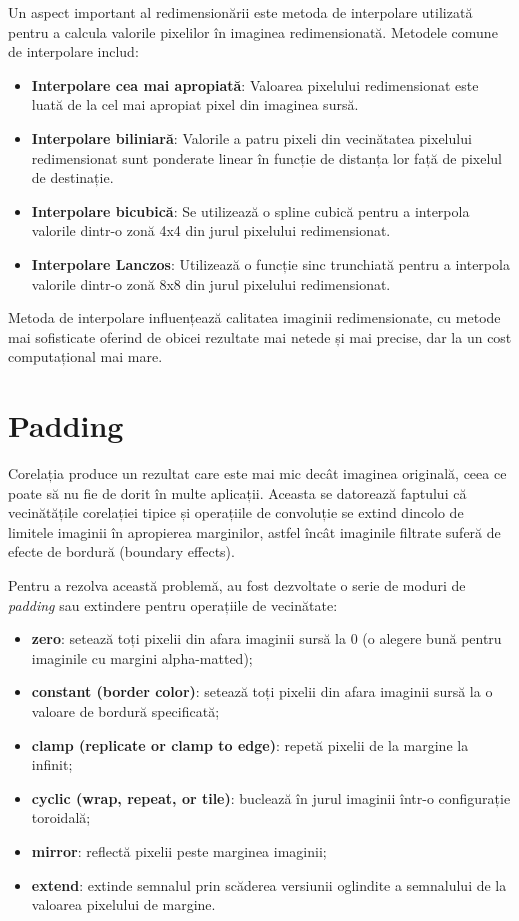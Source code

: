 \documentclass[a4paper,12pt]{report}
\begin{document}
Un aspect important al redimensionării este metoda de interpolare utilizată pentru a calcula valorile pixelilor în imaginea redimensionată. Metodele comune de interpolare includ:
\begin{itemize}
    \item \textbf{Interpolare cea mai apropiată}: Valoarea pixelului redimensionat este luată de la cel mai apropiat pixel din imaginea sursă.
    \item \textbf{Interpolare biliniară}: Valorile a patru pixeli din vecinătatea pixelului redimensionat sunt ponderate linear în funcție de distanța lor față de pixelul de destinație.
    \item \textbf{Interpolare bicubică}: Se utilizează o spline cubică pentru a interpola valorile dintr-o zonă 4x4 din jurul pixelului redimensionat.
    \item \textbf{Interpolare Lanczos}: Utilizează o funcție sinc trunchiată pentru a interpola valorile dintr-o zonă 8x8 din jurul pixelului redimensionat.
\end{itemize}

Metoda de interpolare influențează calitatea imaginii redimensionate, cu metode mai sofisticate oferind de obicei rezultate mai netede și mai precise, dar la un cost computațional mai mare.

\section{Padding}
Corelația produce un rezultat care este mai mic decât imaginea originală, ceea ce poate să nu fie de dorit în multe aplicații. Aceasta se datorează faptului că vecinătățile corelației tipice și operațiile de convoluție se extind dincolo de limitele imaginii în apropierea marginilor, astfel încât imaginile filtrate suferă de efecte de bordură (boundary effects).

Pentru a rezolva această problemă, au fost dezvoltate o serie de moduri de \textit{padding} sau extindere pentru operațiile de vecinătate:

\begin{itemize}
    \item \textbf{zero}: setează toți pixelii din afara imaginii sursă la 0 (o alegere bună pentru imaginile cu margini alpha-matted);
    \item \textbf{constant (border color)}: setează toți pixelii din afara imaginii sursă la o valoare de bordură specificată;
    \item \textbf{clamp (replicate or clamp to edge)}: repetă pixelii de la margine la infinit;
    \item \textbf{cyclic (wrap, repeat, or tile)}: buclează în jurul imaginii într-o configurație toroidală;
    \item \textbf{mirror}: reflectă pixelii peste marginea imaginii;
    \item \textbf{extend}: extinde semnalul prin scăderea versiunii oglindite a semnalului de la valoarea pixelului de margine.
\end{itemize}
\end{document}

